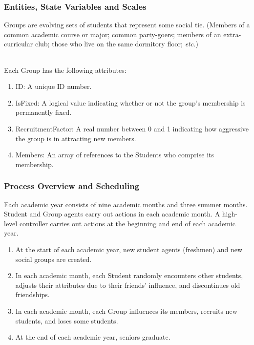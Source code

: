 \documentclass{beamer}
\begin{document}
\begin{frame}
\frametitle{Entities, State Variables and Scales}
Groups are evolving sets of students that represent some social tie. (Members
of a common academic course or major; common party-goers; members of an
extra-curricular club; those who live on the same
dormitory floor; \textit{etc.}) 

~~\\
Each Group has the following attributes:
\begin{enumerate}
\item ID: A unique ID number.
\item IsFixed: A logical value indicating whether or not the group's membership is permanently fixed.
\item RecruitmentFactor: A real number between 0 and 1 indicating how aggressive the group is in attracting new members.
\item Members: An array of references to the Students who comprise its membership.
\end{enumerate}
\end{frame}


\begin{frame}
\frametitle{Process Overview and Scheduling}
Each academic year consists of nine academic months and three summer months. Student and Group agents carry out actions in each academic month. A high-level controller carries out actions at the beginning and end of each academic year.\\

\begin{enumerate}
\item At the start of each academic year, new student agents (freshmen) and
new social groups are created.
\item In each academic month, each Student randomly encounters other students,
adjusts their attributes due to their friends' influence, and discontinues old
friendships.
\item In each academic month, each Group influences its members, recruits new
students, and loses some students. 
\item At the end of each academic year, seniors graduate.
\end{enumerate}
\end{frame}

\end{document}
